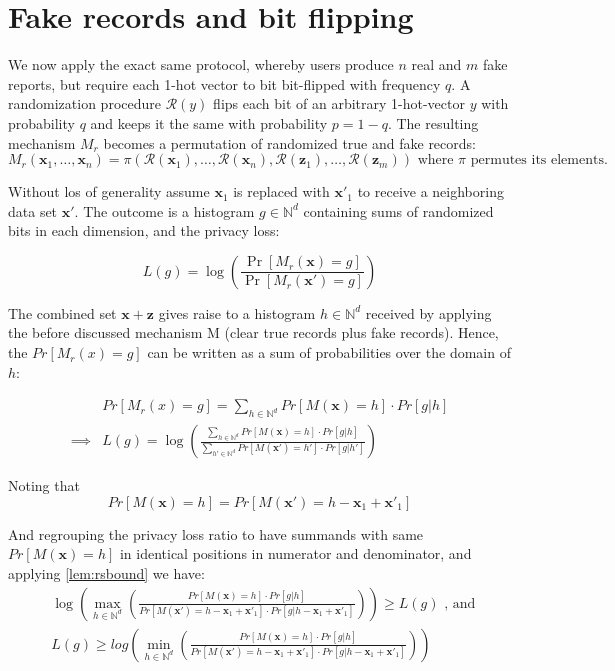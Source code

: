 \documentclass[11pt]{article}
\newcommand{\bbx}{\pmb{x}}
\newcommand{\bbz}{\pmb{z}}
\newcommand{\cR}{\mathcal{R}}
\newcommand{\N}{\mathbb{N}}
\begin{document}

\section{Fake records and bit flipping}

We now apply the exact same protocol, whereby users produce $n$ real and $m$ fake reports, but require each 1-hot vector to bit bit-flipped with frequency $q$.  A randomization procedure $\cR(y)$ flips each bit of an arbitrary 1-hot-vector $y$ with probability $q$ and keeps it the same with probability $p=1-q$.  The resulting mechanism $M_r$ becomes a permutation of randomized true and fake records:
\[
M_r(\bbx_1,  \dots , \bbx_n) = \pi (\cR(\bbx_1), \dots , \cR(\bbx_n), \cR(\bbz_1), \dots , \cR(\bbz_m)) \text{ where } \pi \text{ permutes its elements}. 
\]

Without los of generality assume $\bbx_1$ is replaced with $\bbx'_1$ to receive a neighboring data set $\bbx'$.  The outcome is a histogram $g \in \N^d$ containing sums of randomized bits in each dimension, and the privacy loss:

\begin{equation} \label{eq:lgbound}
L(g) = \log \left ( \frac{\Pr[M_r(\bbx) = g]}{\Pr[M_r(\bbx') = g]} \right )
\end{equation}

The combined set $\bbx + \bbz$ gives raise to a histogram $h \in \N^d$ received by applying the before discussed mechanism M (clear true records plus fake records).  Hence, the $Pr [ M_r(x) = g ]$ can be written as a sum of probabilities over the domain of $h$:

 \begin{align*}
 & Pr [ M_r(x) = g ] = \sum_{h \in \N^d} Pr \left [  M(\bbx) = h \right ] \cdot Pr [ g | h ]  \\
\implies &  L(g) =  \log  \left ( \frac{  \sum_{h \in \N^d} Pr \left [  M(\bbx) = h \right ] \cdot  Pr [ g | h ]   }{    \sum_{h' \in \N^d}  Pr \left [  M(\bbx') = h' \right ] \cdot   Pr[ g | h']   } \right )
\end{align*}

Noting that
\[
 Pr \left [  M(\bbx) = h \right ]  =  Pr \left [  M(\bbx') = h - \bbx_1 + \bbx'_1 \right ]
 \] 
 
And regrouping  the privacy loss ratio to have summands with same $Pr \left [  M(\bbx) = h \right ]$ in identical positions in numerator and denominator, and applying \eqref{lem:rsbound} we have:
 \begin{align*}
& \log \left ( \max_{h \in \N^d} \left ( \frac{  Pr \left [  M(\bbx) = h \right ] \cdot  Pr [ g | h ]   } {   Pr \left [  M(\bbx') = h - \bbx_1 + \bbx'_1 \right ] \cdot  Pr [ g | h  - \bbx_1 + \bbx'_1  ]  }    \right ) \right ) \ge L(g) \text{ , and } \\
& L(g) \ge  log \left ( \min_{h \in \N^d} \left ( \frac{  Pr \left [  M(\bbx) = h \right ] \cdot  Pr [ g | h ]   } {   Pr \left [  M(\bbx') = h - \bbx_1 + \bbx'_1 \right ] \cdot  Pr [ g | h  - \bbx_1 + \bbx'_1  ]  }  \right ) \right ) \\
\end{align*}
\end{document}
